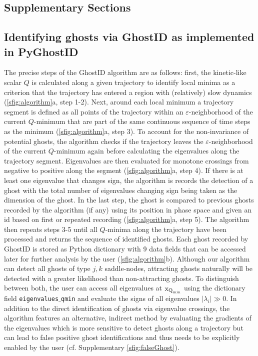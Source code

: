 \documentclass{article}
\theoremstyle{definition}
\begin{document}
\begin{refsection}
\section{Supplementary Sections}

\subsection{Identifying ghosts via GhostID as implemented in PyGhostID}\label{subsec:ghostIDparas}

The precise steps of the GhostID algorithm are as follows: first, the kinetic-like scalar $Q$ is calculated along a given trajectory to identify local minima as a criterion that the trajectory has entered a region with (relatively) slow dynamics (\autoref{sfig:algorithm}a, step 1-2). Next, around each local minimum a trajectory segment is defined as all points of the trajectory within an $\varepsilon$-neighborhood of the current $Q$-minimum that are part of the same continuous sequence of time steps as the minimum (\autoref{sfig:algorithm}a, step 3). To account for the non-invariance of potential ghosts, the algorithm checks if the trajectory leaves the $\varepsilon$-neighborhood of the current $Q$-minimum again before calculating the eigenvalues along the trajectory segment. Eigenvalues are then evaluated for monotone crossings from negative to positive along the segment (\autoref{sfig:algorithm}a, step 4). If there is at least one eigenvalue that changes sign, the algorithm is records the detection of a ghost with the total number of eigenvalues changing sign being taken as the dimension of the ghost. In the last step, the ghost is compared to previous ghosts recorded by the algorithm (if any) using its position in phase space and given an id based on first or repeated recording (\autoref{sfig:algorithm}a, step 5). The algorithm then repeats steps 3-5 until all $Q$-minima along the trajectory have been processed and returns the sequence of identified ghosts. Each ghost recorded by GhostID is stored as Python dictionary with 9 data fields that can be accessed later for further analysis by the user (\autoref{sfig:algorithm}b). Although our algorithm can detect all ghosts of type $j,k$ saddle-nodes, attracting ghosts naturally will be detected with a greater likelihood than non-attracting ghosts. To distinguish between both, the user can access all eigenvalues at $\textnormal{x}_{\textnormal{Q}_{\textnormal{min}}}$ using the dictionary field {\tt eigenvalues$\_$qmin} and evaluate the signs of all eigenvalues $|\lambda_i|\gg0$. In addition to the direct identification of ghosts via eigenvalue crossings, the algorithm features an alternative, indirect method by evaluating the gradients of the eigenvalues which is more sensitive to detect ghosts along a trajectory but can lead to false positive ghost identifications and thus needs to be explicitly enabled by the user (cf. Supplementary \autoref{sfig:falseGhost}).


\end{refsection}
\end{document}
